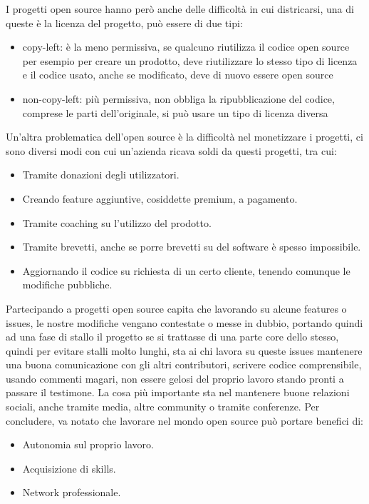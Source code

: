 \documentclass{article}
\begin{document}
I progetti open source hanno però anche delle difficoltà  in cui districarsi, una di queste è la licenza del progetto, può essere di due tipi:
\begin{itemize}
    \item copy-left: è la meno permissiva, se qualcuno riutilizza il codice open source per esempio per creare un prodotto, deve riutilizzare lo stesso tipo di licenza e il codice usato, anche se modificato, deve di nuovo essere open source
    \item non-copy-left: più permissiva, non obbliga la ripubblicazione del codice, comprese le parti dell'originale, si può usare un tipo di licenza diversa
\end{itemize}
Un'altra problematica dell'open source è la difficoltà nel monetizzare i progetti,
ci sono diversi modi con cui un'azienda ricava soldi da questi progetti, tra cui:
\begin{itemize}
    \item Tramite donazioni degli utilizzatori.
    \item Creando feature aggiuntive, cosiddette premium, a pagamento.
    \item Tramite coaching su l'utilizzo del prodotto.
    \item Tramite brevetti, anche se porre brevetti su del software è spesso impossibile.
    \item Aggiornando il codice su richiesta di un certo cliente, tenendo comunque le modifiche pubbliche.
\end{itemize}
Partecipando a progetti open source capita che lavorando su alcune features o issues, le nostre modifiche vengano contestate o messe in dubbio, portando quindi ad una fase di stallo il progetto se si trattasse di una parte core dello stesso, quindi per evitare stalli molto lunghi, sta ai chi lavora su queste issues mantenere una buona comunicazione con gli altri contributori, scrivere codice comprensibile, usando commenti magari, non essere gelosi del proprio lavoro stando pronti a passare il testimone.
La cosa più importante sta nel mantenere buone relazioni sociali, anche tramite media, altre community o tramite conferenze.
Per concludere, va notato che  lavorare nel mondo open source può portare benefici di:
\begin{itemize}
    \item Autonomia sul proprio lavoro.
    \item Acquisizione di skills.
    \item Network professionale.
\end{itemize}
\end{document}
